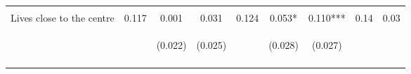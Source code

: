\begin{tabular}{lcccccccc}
 & \begin{footnotesize}\end{footnotesize} & \begin{footnotesize}[0.041]\end{footnotesize} & \begin{footnotesize}[0.001]\end{footnotesize} & \begin{footnotesize}\end{footnotesize} & \begin{footnotesize}[1.000]\end{footnotesize} & \begin{footnotesize}[0.371]\end{footnotesize} & \begin{footnotesize}\end{footnotesize} & \begin{footnotesize}\end{footnotesize}\\
\noalign{\smallskip}Lives close to the centre & 0.117 & 0.001 & 0.031 & 0.124 & 0.053* & 0.110*** & 0.14 & 0.03\\
 & \begin{footnotesize}\end{footnotesize} & \begin{footnotesize}(0.022)\end{footnotesize} & \begin{footnotesize}(0.025)\end{footnotesize} & \begin{footnotesize}\end{footnotesize} & \begin{footnotesize}(0.028)\end{footnotesize} & \begin{footnotesize}(0.027)\end{footnotesize} & \begin{footnotesize}\end{footnotesize} & \begin{footnotesize}\end{footnotesize}\\
 & \begin{footnotesize}\end{footnotesize} & \begin{footnotesize}[0.240]\end{footnotesize} & \begin{footnotesize}[0.046]\end{footnotesize} & \begin{footnotesize}\end{footnotesize} & \begin{footnotesize}[0.435]\end{footnotesize} & \begin{footnotesize}[0.001]\end{footnotesize} & \begin{footnotesize}\end{footnotesize} & \begin{footnotesize}\end{footnotesize}\\ 

\end{tabular}
